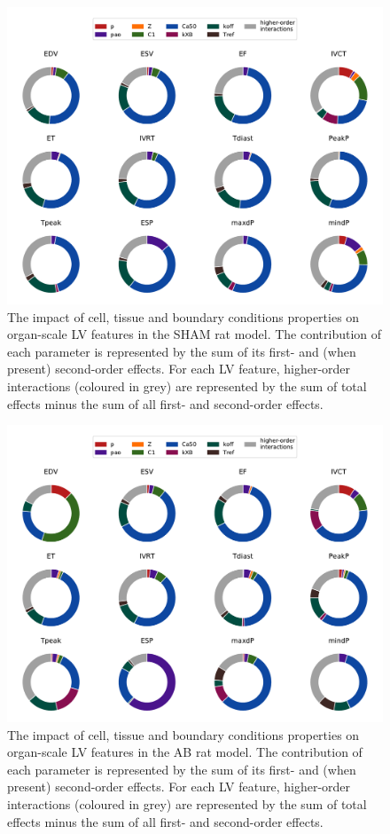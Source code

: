 \begin{figure}[ht!]
    \myfloatalign
    \includegraphics[width=\textwidth]{figures/chapter04/gsa_sham.pdf}
    \caption{The impact of cell, tissue and boundary conditions properties on organ-scale LV features in the SHAM rat model. The contribution of each parameter is represented by the sum of its first- and (when present) second-order effects. For each LV feature, higher-order interactions (coloured in grey) are represented by the sum of total effects minus the sum of all first- and second-order effects.}
    \label{fig:shamgsa}
\end{figure}

\begin{figure}[ht!]
    \myfloatalign
    \includegraphics[width=\textwidth]{figures/chapter04/gsa_ab.pdf}
    \caption{The impact of cell, tissue and boundary conditions properties on organ-scale LV features in the AB rat model. The contribution of each parameter is represented by the sum of its first- and (when present) second-order effects. For each LV feature, higher-order interactions (coloured in grey) are represented by the sum of total effects minus the sum of all first- and second-order effects.}
    \label{fig:abgsa}
\end{figure}

